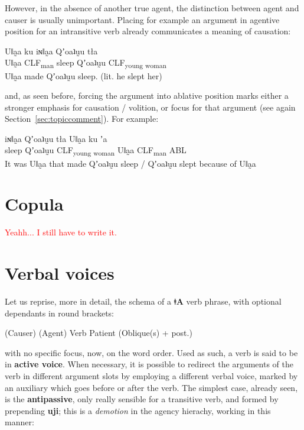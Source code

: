 \documentclass[11pt,a5paper]{book}
\newcommand{\qcn}[1]{\textcolor{AccentText}{\large\textbf{#1}}}
\newcommand{\langname}{\qcn{ǂA}}
\newcommand{\grammsc}[1]{\textsc{#1}}
\newcommand{\CLF}[1]{\grammsc{CLF}\textsubscript{#1}}
\newcommand{\cmnt}[1]{\textcolor{red}{#1}}
\begin{document}
However, in the absence of another true agent, the distinction between agent and causer is usually unimportant. Placing for example an argument in agentive position for an intransitive verb already communicates a meaning of causation:

\begin{exe}
\ex
\gll Uǁa̰a ku iɴǁa̰a Qʼoaʇṵu tła\\
Uǁa̰a \CLF{man} sleep Qʼoaʇṵu \CLF{young woman}\\
\glt Uǁa̰a made Qʼoaʇṵu sleep. (lit. he slept her)
\end{exe}

and, as seen before, forcing the argument into ablative position marks either a stronger emphasis for causation / volition, or focus for that argument (see again Section~\ref{sec:topiccomment}). For example:

\begin{exe}
\ex
\gll iɴǁa̰a Qʼoaʇṵu tła  Uǁa̰a ku ʼa\\
 sleep Qʼoaʇṵu \CLF{young woman} Uǁa̰a \CLF{man} ABL\\
\glt It was Uǁa̰a that made Qʼoaʇṵu sleep / Qʼoaʇṵu slept because of Uǁa̰a
\end{exe}

\section{Copula}

\label{sec:copula}

\cmnt{Yeahh... I still have to write it.}

\section{Verbal voices}\label{sec:valencychanging}

Let us reprise, more in detail, the schema of a \langname{} verb phrase, with optional dependants in round brackets:

\begin{center}
(Causer) (Agent) Verb Patient (Oblique(s) + post.)
\end{center}

with no specific focus, now, on the word order. Used as such, a verb is said to be in \textbf{active voice}. When necessary, it is possible to redirect the arguments of the verb in different argument slots by employing a different verbal voice, marked by an auxiliary which goes before or after the verb. The simplest case, already seen, is the \textbf{antipassive}, only really sensible for a transitive verb, and formed by prepending \qcn{uji}; this is a \emph{demotion} in the agency hierachy, working in this manner:
\end{document}
